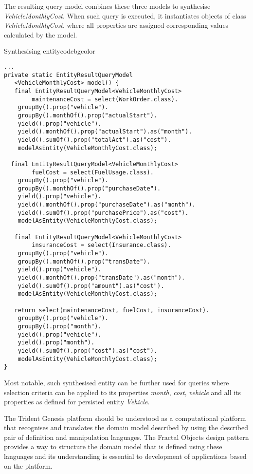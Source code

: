   The resulting query model combines these three models to synthesise \emph{VehicleMonthlyCost}.
  When such query is executed, it instantiates objects of class \emph{VehicleMonthlyCost}, where all properties are assigned corresponding values calculated by the model.

  \begin{code}{Synthesising entity}{\label{lst:eql4}}{codebgcolor}
    \begin{lstlisting}[numbersep=10pt]
...   
private static EntityResultQueryModel
   <VehicleMonthlyCost> model() {
   final EntityResultQueryModel<VehicleMonthlyCost> 
        maintenanceCost = select(WorkOrder.class).
	groupBy().prop("vehicle").
	groupBy().monthOf().prop("actualStart").
	yield().prop("vehicle").
	yield().monthOf().prop("actualStart").as("month").
	yield().sumOf().prop("totalAct").as("cost").
	modelAsEntity(VehicleMonthlyCost.class);

  final EntityResultQueryModel<VehicleMonthlyCost> 
        fuelCost = select(FuelUsage.class).
	groupBy().prop("vehicle").
	groupBy().monthOf().prop("purchaseDate").
	yield().prop("vehicle").
	yield().monthOf().prop("purchaseDate").as("month").
	yield().sumOf().prop("purchasePrice").as("cost").
	modelAsEntity(VehicleMonthlyCost.class);

   final EntityResultQueryModel<VehicleMonthlyCost> 
        insuranceCost = select(Insurance.class).
	groupBy().prop("vehicle").
	groupBy().monthOf().prop("transDate").
	yield().prop("vehicle").
	yield().monthOf().prop("transDate").as("month").
	yield().sumOf().prop("amount").as("cost").
	modelAsEntity(VehicleMonthlyCost.class);

   return select(maintenanceCost, fuelCost, insuranceCost).
	groupBy().prop("vehicle").
	groupBy().prop("month").
	yield().prop("vehicle").
	yield().prop("month").
	yield().sumOf().prop("cost").as("cost").
	modelAsEntity(VehicleMonthlyCost.class);
}  
    \end{lstlisting}   
  \end{code}  

  Most notable, such synthesised entity can be further used for queries where selection criteria can be applied to its properties \emph{month}, \emph{cost}, \emph{vehicle} and all its properties as defined for persisted entity \emph{Vehicle}.

  
  The Trident Genesis platform should be understood as a computational platform that recognises and translates the domain model described by using the described pair of definition and manipulation languages.
  The Fractal Objects design pattern provides a way to structure the domain model that is defined using these languages and its understanding is essential to development of applications based on the platform.